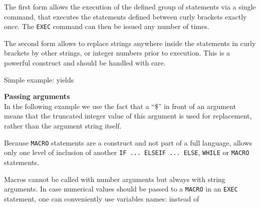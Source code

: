 
The first form allows the execution of the defined group of statements via a
single command,  
that executes the statements defined between curly brackets exactly
once. The \texttt{EXEC} command can then be issued any number of times.  

The second form allows to replace strings anywhere inside the statements
in curly brackets by other strings, or integer numbers prior to
execution. This is a powerful construct and should be handled with care.  

Simple example: 
yields

\textbf{Passing arguments}\\
In the following example we use the fact that a ``\$'' in front of an
argument means that the truncated integer value of this argument is used
for replacement, rather than the argument string itself.  


Because \texttt{MACRO} statements are a \madx construct and not part of
a full language, \madx  allows only one level of inclusion of another
\texttt{IF ... ELSEIF ... ELSE}, \texttt{WHILE} or \texttt{MACRO}
statements.   


Macros cannot be called with number arguments but always with string
arguments. In case numerical values should be passed to a \texttt{MACRO}
in an \texttt{EXEC} statement, one can conveniently use variables names: 
instead of 

